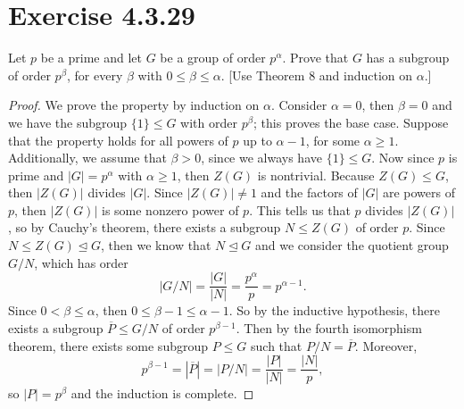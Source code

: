 \documentclass[12pt]{article}
\newenvironment{problem}
    {\begin{lrbox}{\mybox}\begin{minipage}{0.98\textwidth}}
    {\end{minipage}\end{lrbox}\framebox[\textwidth]{\usebox{\mybox}}}
\newcommand{\<}{\left\langle} %
\renewcommand{\>}{\right\rangle} %
\let\conj\overline %
\let\teq\trianglelefteq %
\begin{document}
\newpage
\section{Exercise 4.3.29}
\begin{problem}
    Let $p$ be a prime and let $G$ be a group of order $p^\alpha$. Prove that $G$ has a subgroup of order $p^\beta$, for every $\beta$ with $0 \leq \beta \leq \alpha$. [Use Theorem 8 and induction on $\alpha$.]
\end{problem}

\begin{proof}
    We prove the property by induction on $\alpha$. Consider $\alpha = 0$, then $\beta = 0$ and we have the subgroup $\{1\} \leq G$ with order $p^\beta$; this proves the base case. Suppose that the property holds for all powers of $p$ up to $\alpha - 1$, for some $\alpha \geq 1$. Additionally, we assume that $\beta > 0$, since we always have $\{1\} \leq G$. Now since $p$ is prime and $|G| = p^\alpha$ with $\alpha \geq 1$, then $Z(G)$ is nontrivial. Because $Z(G) \leq G$, then $|Z(G)|$ divides $|G|$. Since $|Z(G)| \ne 1$ and the factors of $|G|$ are powers of $p$, then $|Z(G)|$ is some nonzero power of $p$. This tells us that $p$ divides $|Z(G)|$, so by Cauchy's theorem, there exists a subgroup $N \leq Z(G)$ of order $p$. Since $N \leq Z(G) \teq G$, then we know that $N \teq G$ and we consider the quotient group $G/N$, which has order
    \[|G/N| = \frac{|G|}{|N|} = \frac{p^\alpha}{p} = p^{\alpha - 1}.\]
    Since $0 < \beta \leq \alpha$, then $0 \leq \beta - 1 \leq \alpha - 1$. So by the inductive hypothesis, there exists a subgroup $\conj{P} \leq G/N$ of order $p^{\beta - 1}$. Then by the fourth isomorphism theorem, there exists some subgroup $P \leq G$ such that $P/N = \conj{P}$. Moreover,
    \[p^{\beta - 1} = |\conj{P}| = |P/N| = \frac{|P|}{|N|} = \frac{|N|}{p},\]
    so $|P| = p^{\beta}$ and the induction is complete.
    
\end{proof}
\end{document}
